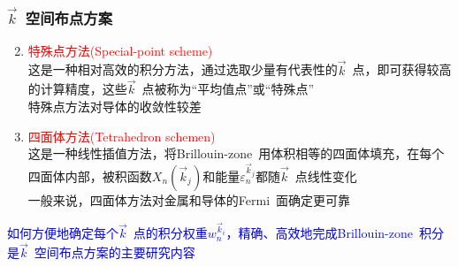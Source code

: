 \documentclass[cjk,slidestop,compress,mathserif,blue]{beamer}
\begin{document}
\frame
{
\frametitle{$\vec k$~空间布点方案}
\begin{enumerate}
	\setcounter{enumi}{1}
\setlength{\itemsep}{10pt}
	\item \textcolor{red}{特殊点方法\textrm{(Special-point scheme)}}\\这是一种相对高效的积分方法，通过选取少量有代表性的$\vec k$~点，即可获得较高的计算精度，这些$\vec k$~点被称为“平均值点”或“特殊点”\\特殊点方法对导体的收敛性较差
	\item \textcolor{red}{四面体方法\textrm{(Tetrahedron schemen)}}\\这是一种线性插值方法，将\textrm{Brillouin-zone~}用体积相等的四面体填充，在每个四面体内部，被积函数$X_n(\vec k_j)$和能量$\varepsilon_n^{\vec k_j}$都随$\vec k$~点线性变化\\一般来说，四面体方法对金属和导体的\textrm{Fermi~}面确定更可靠
\end{enumerate}
\textcolor{blue}{如何方便地确定每个$\vec k$~点的积分权重$w_n^{\vec k_i}$，精确、高效地完成\textrm{Brillouin-zone~}积分是$\vec k$~空间布点方案的主要研究内容}
}
\end{document}
